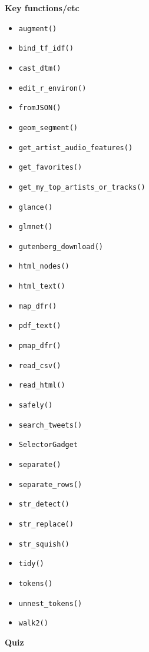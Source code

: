 \documentclass[
]{book}
\providecommand{\tightlist}{%
  \setlength{\itemsep}{0pt}\setlength{\parskip}{0pt}}
\begin{document}
\textbf{Key functions/etc}

\begin{itemize}
\tightlist
\item
  \texttt{augment()}
\item
  \texttt{bind\_tf\_idf()}
\item
  \texttt{cast\_dtm()}
\item
  \texttt{edit\_r\_environ()}
\item
  \texttt{fromJSON()}
\item
  \texttt{geom\_segment()}
\item
  \texttt{get\_artist\_audio\_features()}
\item
  \texttt{get\_favorites()}
\item
  \texttt{get\_my\_top\_artists\_or\_tracks()}
\item
  \texttt{glance()}
\item
  \texttt{glmnet()}
\item
  \texttt{gutenberg\_download()}
\item
  \texttt{html\_nodes()}
\item
  \texttt{html\_text()}
\item
  \texttt{map\_dfr()}
\item
  \texttt{pdf\_text()}
\item
  \texttt{pmap\_dfr()}
\item
  \texttt{read\_csv()}
\item
  \texttt{read\_html()}
\item
  \texttt{safely()}
\item
  \texttt{search\_tweets()}
\item
  \texttt{SelectorGadget}
\item
  \texttt{separate()}
\item
  \texttt{separate\_rows()}
\item
  \texttt{str\_detect()}
\item
  \texttt{str\_replace()}
\item
  \texttt{str\_squish()}
\item
  \texttt{tidy()}
\item
  \texttt{tokens()}
\item
  \texttt{unnest\_tokens()}
\item
  \texttt{walk2()}
\end{itemize}

\textbf{Quiz}
\end{document}
